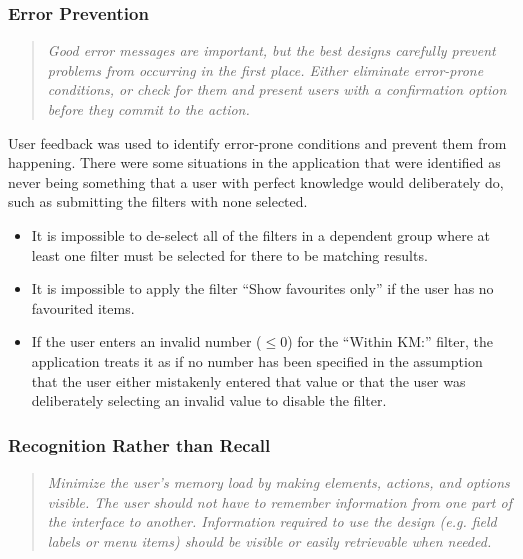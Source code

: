 \documentclass[a4paper,11pt]{report}
\begin{document}
\subsubsection{Error Prevention}
\begin{quote}
    \textit{ Good error messages are important, but the best designs carefully prevent problems from occurring in the first place. Either eliminate error-prone conditions, or check for them and present users with a confirmation option before they commit to the action. }
\end{quote}
User feedback was used to identify error-prone conditions and prevent them from happening. 
There were some situations in the application that were identified as never being something that a user with perfect knowledge would deliberately do, such as submitting the filters with none selected.
\begin{itemize}
    \item   It is impossible to de-select all of the filters in a dependent group where at least one filter must be selected for there to be matching results.
    \item   It is impossible to apply the filter ``Show favourites only'' if the user has no favourited items.
    \item   If the user enters an invalid number ($\leq 0$) for the ``Within KM:'' filter, the application treats it as if no number has been specified in the assumption that the user either mistakenly entered that value or that the user was deliberately selecting an invalid value to disable the filter. 
\end{itemize}

\subsubsection{Recognition Rather than Recall}
\begin{quote}
    \textit{ Minimize the user's memory load by making elements, actions, and options visible. The user should not have to remember information from one part of the interface to another. Information required to use the design (e.g. field labels or menu items) should be visible or easily retrievable when needed. }
\end{quote}
\end{document}
